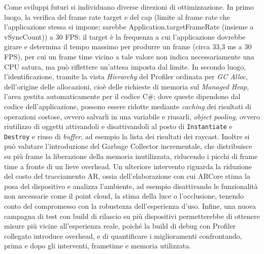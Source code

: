  Come sviluppi futuri si individuano diverse direzioni di ottimizzazione. In
primo luogo, la verifica del frame rate target e del cap (limite al frame rate che l’applicazione stessa si impone; sarebbe Application.targetFrameRate (insieme a vSyncCount)) a 30 FPS: il target
è la frequenza a cui l'applicazione dovrebbe girare e determina il tempo
massimo per produrre un frame (circa 33,3 ms a 30 FPS), per cui un frame time
vicino a tale valore non indica necessariamente una CPU satura, ma può
riflettere un'attesa imposta dal limite. In secondo luogo, l'identificazione,
tramite la vista \textit{Hierarchy} del Profiler ordinata per \textit{GC
Alloc}, dell'origine delle allocazioni, cioè delle richieste di memoria sul
\textit{Managed Heap}, l'area gestita automaticamente per il codice C\#; dove
queste dipendono dal codice dell'applicazione, possono essere ridotte
mediante \textit{caching} dei risultati di operazioni costose, ovvero salvarli in una variabile e riusarli, \textit{object
pooling}, ovvero riutilizzo di oggetti attivandoli e disattivandoli al posto di
\texttt{Instantiate} e \texttt{Destroy} e riuso di \textit{buffer}, ad
esempio la lista dei risultati dei raycast.
Inoltre si può valutare l'introduzione del Garbage Collector incrementale, che distribuisce su più frame la liberazione della memoria inutilizzata, riducendo i picchi di frame time a
fronte di un lieve overhead. 
Un ulteriore intervento riguarda la riduzione del costo del tracciamento AR, ossia dell'elaborazione con cui ARCore stima la posa del dispositivo e analizza l'ambiente, ad esempio disattivando le funzionalità non necessarie come il point cloud, la stima della luce o
l'occlusione, tenendo conto del compromesso con la robustezza dell'esperienza
d'uso. 
Infine, una nuova campagna di test con build di rilascio su più dispositivi permetterebbe di ottenere misure più vicine all'esperienza reale, poiché la build di debug con Profiler collegato introduce overhead, e di quantificare i miglioramenti confrontando, prima e dopo gli interventi, frametime e memoria utilizzata.

